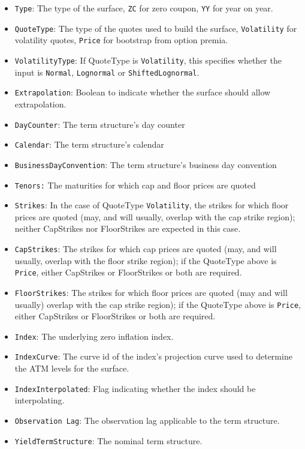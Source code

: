 \begin{itemize}
\item {\tt Type}: The type of the surface, {\tt ZC} for zero coupon, {\tt YY} for year on year.
\item {\tt QuoteType}: The type of the quotes used to build the surface, {\tt Volatility} for volatility quotes, {\tt Price} for bootstrap from option premia.
\item {\tt VolatilityType}: If QuoteType is {\tt Volatility}, this specifies whether the input is {\tt Normal}, {\tt Lognormal} or {\tt ShiftedLognormal}.
\item {\tt Extrapolation}: Boolean to indicate whether the surface should allow extrapolation.
\item {\tt DayCounter}: The term structure's day counter
\item {\tt Calendar}: The term structure's calendar
\item {\tt BusinessDayConvention}: The term structure's business day convention
\item {\tt Tenors:} The maturities for which cap and floor prices are quoted
\item {\tt Strikes}: In the case of QuoteType {\tt Volatility}, the strikes for which floor prices are quoted (may, and will usually, overlap with the cap
  strike region); neither CapStrikes nor FloorStrikes are expected in this case.
\item {\tt CapStrikes}: The strikes for which cap prices are quoted (may, and will usually, overlap with the floor
  strike region); if the QuoteType above is {\tt Price}, either CapStrikes or FloorStrikes or both are required.
\item {\tt FloorStrikes}: The strikes for which floor prices are quoted (may and will usually) overlap with the cap
  strike region); if the QuoteType above is {\tt Price}, either CapStrikes or FloorStrikes or both are required.
\item {\tt Index}: The underlying zero inflation index.
\item {\tt IndexCurve}: The curve id of the index's projection curve used to determine the ATM levels for the surface.
\item {\tt IndexInterpolated}: Flag indicating whether the index should be interpolating.
\item {\tt Observation Lag}: The observation lag applicable to the term structure.
\item {\tt YieldTermStructure}: The nominal term structure.

\end{itemize}
